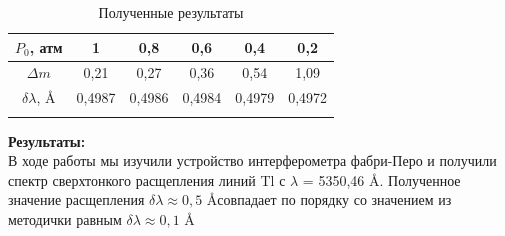 \documentclass[a4paper, 12pt]{article}%
\begin{document}
	\begin{longtable}{|c|c|c|c|c|c|}
 		\hline
 		$P_0$, атм & 1 & 0,8 & 0,6 & 0,4 & 0,2  \\ \hline
 		$\Delta m$	& 0,21 & 0,27 & 0,36 & 0,54 & 1,09  \\ \hline
 		$ \delta \lambda $, \AA & 0,4987 & 0,4986 & 0,4984 & 0,4979 & 0,4972 \\ \hline
 		\caption{Полученные результаты}
 	\end{longtable}

	\textbf{Результаты: }\\
	
	В ходе работы мы изучили устройство интерферометра фабри-Перо и получили спектр сверхтонкого расщепления линий Tl с $\lambda$ = 5350,46 \AA. Полученное значение расщепления $\delta \lambda \approx 0,5$ \AA  совпадает по порядку со значением из методички равным $\delta \lambda \approx 0,1$ \AA
	
\end{document}
